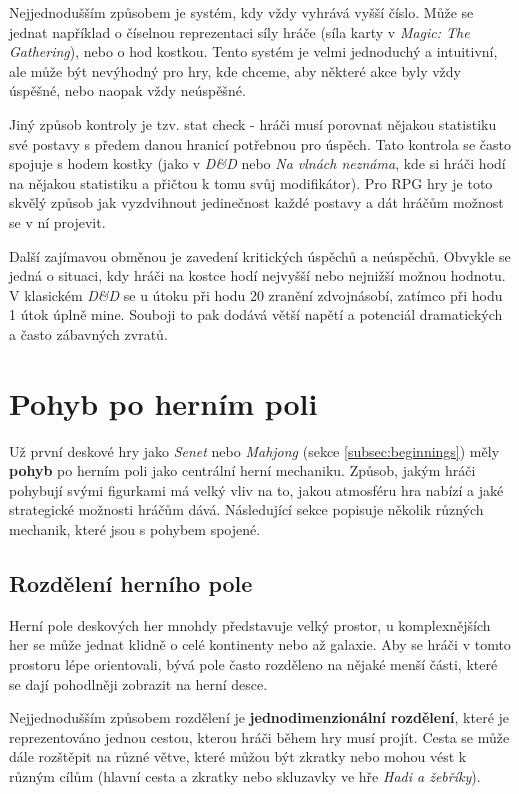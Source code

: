 Nejjednodušším způsobem je systém, kdy vždy vyhrává vyšší číslo. Může se jednat například o číselnou reprezentaci síly hráče (síla karty v \textit{Magic: The Gathering}), nebo o hod kostkou. Tento systém je velmi jednoduchý a intuitivní, ale může být nevýhodný pro hry, kde chceme, aby některé akce byly vždy úspěšné, nebo naopak vždy neúspěšné.

Jiný způsob kontroly je tzv. stat check - hráči musí porovnat nějakou statistiku své postavy s předem danou hranicí potřebnou pro úspěch. Tato kontrola se často spojuje s hodem kostky (jako v \textit{D\&D} nebo \textit{Na vlnách neznáma}, kde si hráči hodí na nějakou statistiku a přičtou k tomu svůj modifikátor). Pro RPG hry je toto skvělý způsob jak vyzdvihnout jedinečnost každé postavy a dát hráčům možnost se v ní projevit.

Další zajímavou obměnou je zavedení kritických úspěchů a neúspěchů. Obvykle se jedná o situaci, kdy hráči na kostce hodí nejvyšší nebo nejnižší možnou hodnotu. V klasickém \textit{D\&D} se u útoku při hodu 20 zranění zdvojnásobí, zatímco při hodu 1 útok úplně mine. Souboji to pak dodává větší napětí a potenciál dramatických a často zábavných zvratů.



\section{Pohyb po herním poli}
\label{sec:movement}

Už první deskové hry jako \textit{Senet} nebo \textit{Mahjong} (sekce \ref{subsec:beginnings}) měly \textbf{pohyb} po herním poli jako centrální herní mechaniku. Způsob, jakým hráči pohybují svými figurkami má velký vliv na to, jakou atmosféru hra nabízí a jaké strategické možnosti hráčům dává. Následující sekce popisuje několik různých mechanik, které jsou s pohybem spojené.

\subsection{Rozdělení herního pole}
\label{subsec:movement_tessellation}

Herní pole deskových her mnohdy představuje velký prostor, u komplexnějších her se může jednat klidně o celé kontinenty nebo až galaxie. Aby se hráči v tomto prostoru lépe orientovali, bývá pole často rozděleno na nějaké menší části, které se dají pohodlněji zobrazit na herní desce.

Nejjednodušším způsobem rozdělení je \textbf{jednodimenzionální rozdělení}, které je reprezentováno jednou cestou, kterou hráči během hry musí projít. Cesta se může dále rozštěpit na různé větve, které můžou být zkratky nebo mohou vést k různým cílům (hlavní cesta a zkratky nebo skluzavky ve hře \textit{Hadi a žebříky}).

